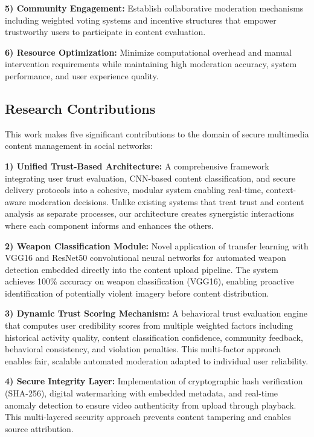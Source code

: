 \documentclass[conference]{IEEEtran}
\begin{document}
\textbf{5) Community Engagement:} Establish collaborative moderation mechanisms including weighted voting systems and incentive structures that empower trustworthy users to participate in content evaluation.

\textbf{6) Resource Optimization:} Minimize computational overhead and manual intervention requirements while maintaining high moderation accuracy, system performance, and user experience quality.
\vspace{-1mm}
\subsection{Research Contributions}

This work makes five significant contributions to the domain of secure multimedia content management in social networks:

\textbf{1) Unified Trust-Based Architecture:} A comprehensive framework integrating user trust evaluation, CNN-based content classification, and secure delivery protocols into a cohesive, modular system enabling real-time, context-aware moderation decisions. Unlike existing systems that treat trust and content analysis as separate processes, our architecture creates synergistic interactions where each component informs and enhances the others.

\textbf{2) Weapon Classification Module:} Novel application of transfer learning with VGG16 and ResNet50 convolutional neural networks for automated weapon detection embedded directly into the content upload pipeline. The system achieves 100\% accuracy on weapon classification (VGG16), enabling proactive identification of potentially violent imagery before content distribution.

\textbf{3) Dynamic Trust Scoring Mechanism:} A behavioral trust evaluation engine that computes user credibility scores from multiple weighted factors including historical activity quality, content classification confidence, community feedback, behavioral consistency, and violation penalties. This multi-factor approach enables fair, scalable automated moderation adapted to individual user reliability.

\textbf{4) Secure Integrity Layer:} Implementation of cryptographic hash verification (SHA-256), digital watermarking with embedded metadata, and real-time anomaly detection to ensure video authenticity from upload through playback. This multi-layered security approach prevents content tampering and enables source attribution.
\end{document}
